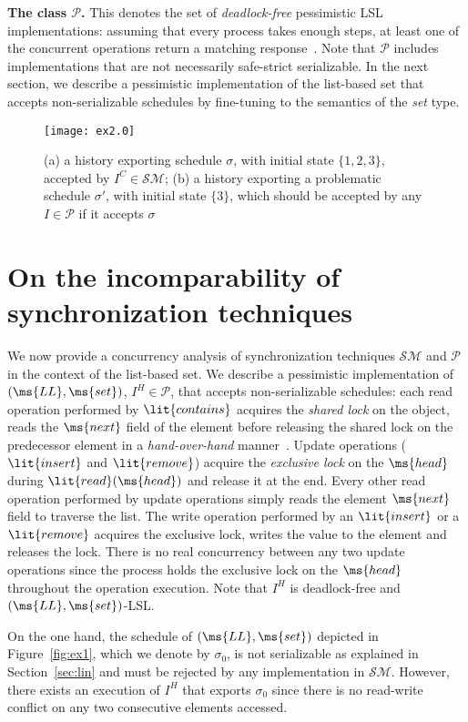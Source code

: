 \documentclass[11pt,pdftex,letterpaper]{article}
\newcommand{\LL}{\ms{LL}}
\begin{document}
\vspace{1mm}\noindent\textbf{The class $\mathcal{P}$.}
This denotes the set of \emph{deadlock-free} pessimistic
LSL implementations: assuming that every process takes
enough steps, 
at least one of the concurrent operations return a matching response~\cite{HS11-progress}.
Note that $\mathcal{P}$ includes implementations that are not necessarily safe-strict serializable. 
In the next section, we describe a pessimistic implementation of the list-based set that accepts non-serializable schedules by
fine-tuning to the semantics of the \emph{set} type.
\begin{figure*}
 \texttt{[image: ex2.0]}
 \caption{\small{(a) a history exporting schedule $\sigma$, with initial state
   $\{1,2,3\}$, accepted by $I^{C}\in \mathcal{SM}$; 
(b) a history exporting a problematic schedule $\sigma'$, with initial state 
   $\{3\}$, which should be accepted by any $I\in\mathcal{P}$ if it accepts $\sigma$}}\label{fig:ex2}\vspace{-0.35mm}
\end{figure*}
\section{On the incomparability of synchronization techniques}\label{sec:incomparability}
We now provide a concurrency analysis of synchronization techniques $\mathcal{SM}$ and $\mathcal{P}$
in the context of the list-based set.
We describe a pessimistic implementation of $(\LL,\ms{set})$, $I^H \in \mathcal{P}$,
that accepts non-serializable schedules: each read operation performed by $\lit{contains}$ 
acquires the \emph{shared lock} on the object, 
reads the $\ms{next}$ field of the element before releasing the shared lock on the predecessor element 
in a \emph{hand-over-hand} manner~\cite{BS88}.
Update operations ($\lit{insert}$ and
$\lit{remove}$) acquire the \emph{exclusive lock} on the $\ms{head}$ during $\lit{read}(\ms{head})$ 
and release it at the end. Every other read operation performed 
by update operations simply reads the element $\ms{next}$ field to traverse the list. The write operation
performed by an $\lit{insert}$ or a $\lit{remove}$ acquires the exclusive lock, writes the value
to the element and releases the lock.
There is no real concurrency between any two update operations since the process holds the 
exclusive lock on the $\ms{head}$ throughout the operation execution.
Note that $I^H$ is deadlock-free and $(\LL,\ms{set})$-LSL.

On the one hand, the schedule of $(\LL,\ms{set})$ depicted in Figure~\ref{fig:ex1}, which we denote by $\sigma_0$, is not serializable
as explained in Section~\ref{sec:lin}
and must be rejected by any implementation in $\mathcal{SM}$.
However, there exists an execution of $I^H$ that exports $\sigma_0$
since there is no read-write conflict on any two consecutive elements accessed.
\end{document}
